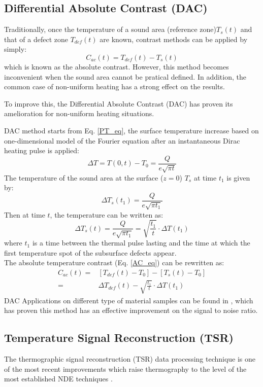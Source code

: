 \subsection{Differential Absolute Contrast (DAC)}
Traditionally, once the temperature of a sound area (reference zone)$T_s(t) $ and that of a defect zone $T_{def}(t) $ are known, contrast methods can be applied by simply:
\begin{equation}
C_{ac}(t) = T_{def}(t) - T_s(t)
\label{AC_eq}
\end{equation}
which is known as the absolute contrast. However, this method becomes inconvenient when the sound area cannot be pratical defined. In addition, the common case of non-uniform heating has a strong effect on the results.

To improve this, the Differential Absolute Contrast (DAC) has proven its amelioration for non-uniform heating situations\citep{Benitez2008, pilla2002new}.

DAC method starts from Eq. \ref{PT_eq}, the surface temperature increase based on one-dimensional model of the Fourier equation after an instantaneous Dirac heating pulse is applied:
\begin{equation}
\Delta T = T(0,t) - T_0  = \frac{Q}{e\sqrt{\pi t}}
\label{PT_eq_2}
\end{equation}
The temperature of the sound area at the surface ($z=0$) $T_s$ at time $t_1$ is given by:
\begin{equation}
\Delta T_s(t_1) = \frac{Q}{e\sqrt{\pi t_1}}
\end{equation}
Then at time $t$, the temperature can be written as:
\begin{equation}
\Delta T_s(t) = \frac{Q}{e\sqrt{\pi t_1}} = \sqrt{\frac{t_1}{t}}\cdot \Delta T(t_1)
\end{equation}
where $t_1$ is a time between the thermal pulse lasting and the time at which the first temperature spot of the subsurface defects appear.\\
The absolute temperature contrast (Eq. \ref{AC_eq}) can be rewritten as:
\begin{align}
C_{ac}(t) = & [T_{def}(t) -T_0] - [T_s(t) - T_0] \\ 
		  = & \Delta T_{def}(t) - \sqrt{\frac{t_1}{t}}\cdot \Delta T(t_1)
\end{align}
DAC Applications on different type of material samples can be found in \citep{pilla2002new}, which has proven this method has an effective improvement on the signal to noise ratio.

\subsection{Temperature Signal Reconstruction (TSR)}
The thermographic signal reconstruction (TSR) data processing technique is one of the most recent improvements which raise thermography to the level of the most established NDE techniques \citep{Balageas2015}.

